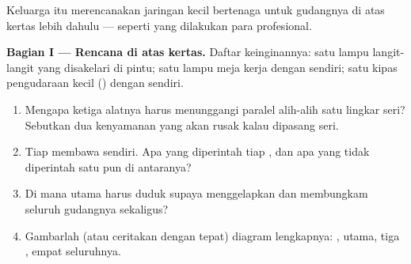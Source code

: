 \begin{problem}\label{pb:g6:circuits-and-safety:1}
Keluarga itu merencanakan jaringan kecil bertenaga  untuk
gudangnya di atas kertas lebih dahulu --- seperti yang dilakukan para
profesional.

\medskip\noindent\textbf{Bagian I --- Rencana di atas kertas.}
Daftar keinginannya: satu lampu langit-langit yang disakelari di
pintu; satu lampu meja kerja dengan  sendiri; satu kipas
pengudaraan kecil () dengan  sendiri.
\begin{enumerate}
  \item Mengapa ketiga alatnya harus menunggangi  paralel
        alih-alih satu lingkar seri? Sebutkan dua kenyamanan yang
        akan rusak kalau dipasang seri.
  \item Tiap  membawa  sendiri. Apa yang diperintah
        tiap , dan apa yang tidak diperintah satu pun di
        antaranya?
  \item Di mana  utama harus duduk supaya menggelapkan dan
        membungkam seluruh gudangnya sekaligus?
  \item Gambarlah (atau ceritakan dengan tepat) diagram lengkapnya:
        ,  utama, tiga , empat 
        seluruhnya.
\end{enumerate}


\end{problem}
